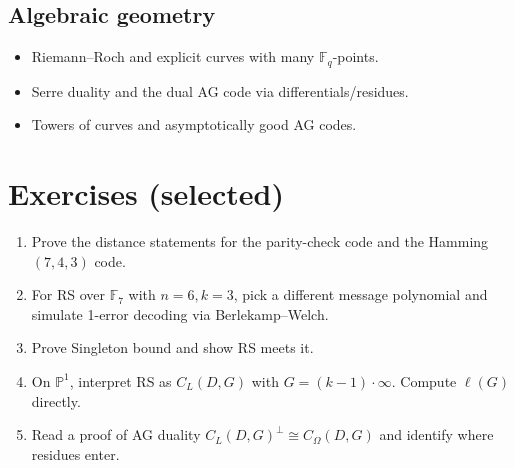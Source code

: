 \documentclass[11pt]{article}
\theoremstyle{definition}
\theoremstyle{remark}
\newcommand{\F}{\mathbb{F}}
\newcommand{\PP}{\mathbb{P}}
\begin{document}
	\subsection{Algebraic geometry}
	\begin{itemize}
		\item Riemann--Roch and explicit curves with many \(\F_q\)-points.
		\item Serre duality and the dual AG code via differentials/residues.
		\item Towers of curves and asymptotically good AG codes.
	\end{itemize}
	
	\section*{Exercises (selected)}
	\begin{enumerate}
		\item Prove the distance statements for the parity-check code and the Hamming \((7,4,3)\) code.
		\item For RS over \(\F_7\) with \(n=6,k=3\), pick a different message polynomial and simulate 1-error decoding via Berlekamp--Welch.
		\item Prove Singleton bound and show RS meets it.
		\item On \(\PP^1\), interpret RS as \(C_L(D,G)\) with \(G=(k-1)\cdot\infty\). Compute \(\ell(G)\) directly.
		\item Read a proof of AG duality \(C_L(D,G)^\perp \cong C_\Omega(D,G)\) and identify where residues enter.
	\end{enumerate}
	
\end{document}
